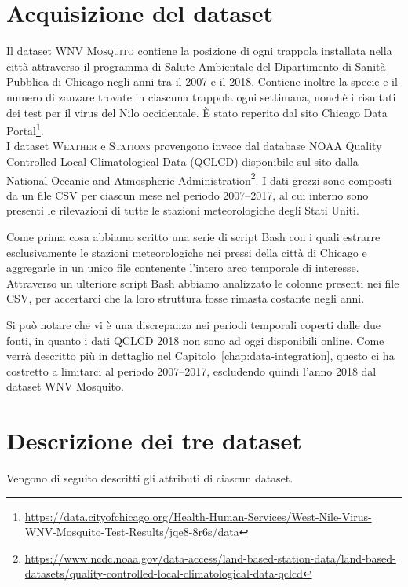 \section{Acquisizione del dataset}
Il dataset \textsc{WNV Mosquito} contiene la posizione di ogni trappola 
installata nella città attraverso il programma di Salute Ambientale del 
Dipartimento di Sanità Pubblica di Chicago negli anni tra il 2007 e il 2018. 
Contiene inoltre la specie e il numero di zanzare trovate in ciascuna trappola 
ogni settimana, nonchè i risultati dei test per il virus del Nilo occidentale. 
È stato reperito dal sito Chicago Data 
Portal\footnote{\url{https://data.cityofchicago.org/Health-Human-Services/West-Nile-Virus-WNV-Mosquito-Test-Results/jqe8-8r6s/data}}.
\\

I dataset \textsc{Weather} e \textsc{Stations} provengono invece dal database 
NOAA Quality Controlled Local Climatological Data (QCLCD) disponibile sul sito 
dalla National Oceanic and Atmospheric 
Administration\footnote{\url{https://www.ncdc.noaa.gov/data-access/land-based-station-data/land-based-datasets/quality-controlled-local-climatological-data-qclcd}}.
I dati grezzi sono composti da un file CSV per ciascun mese nel periodo 
2007--2017, al cui interno sono presenti le rilevazioni di tutte le stazioni 
meteorologiche degli Stati Uniti.

Come prima cosa abbiamo scritto una serie di script Bash con i quali estrarre 
esclusivamente le stazioni meteorologiche nei pressi della città di Chicago e 
aggregarle in un unico file contenente l'intero arco temporale di interesse. 
Attraverso un ulteriore script Bash abbiamo analizzato le colonne presenti nei 
file CSV, per accertarci che la loro struttura fosse rimasta costante negli 
anni.

Si può notare che vi è una discrepanza nei periodi temporali coperti dalle due 
fonti, in quanto i dati QCLCD 2018 non sono ad oggi disponibili online. Come 
verrà descritto più in dettaglio nel Capitolo~\ref{chap:data-integration}, 
questo ci ha costretto a limitarci al periodo 2007--2017, escludendo quindi 
l'anno 2018 dal dataset WNV Mosquito.

\section{Descrizione dei tre dataset}
Vengono di seguito descritti gli attributi di ciascun dataset.

